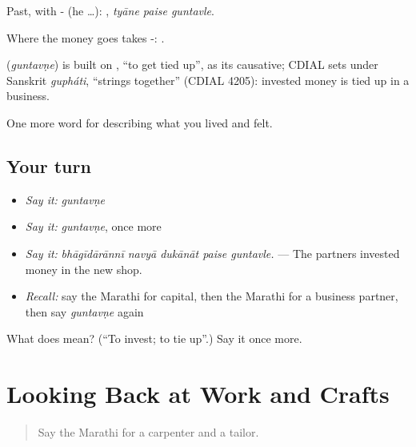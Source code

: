Past, with - (he …):   , \emph{tyāne paise guntavle}.

Where the money goes takes -:   .

\begin{cousinweb}
\textbf{} (\emph{guntavṇe}) is built on , \textquotedblleft{}to get tied up\textquotedblright{}, as its causative; CDIAL sets  under Sanskrit \emph{gupháti}, \textquotedblleft{}strings together\textquotedblright{} (CDIAL 4205): invested money is tied up in a business.
\end{cousinweb}

\begin{grammarlens}[title={What you've built}]
One more word for describing what you lived and felt.
\end{grammarlens}

\subsection*{Your turn}
\begin{itemize}
\raggedright
  \item \emph{Say it:} \emph{guntavṇe}
  \item \emph{Say it:} \emph{guntavṇe}, once more
  \item \emph{Say it:} \emph{bhāgīdārānnī navyā dukānāt paise guntavle.} — The partners invested money in the new shop.
  \item \emph{Recall:} say the Marathi for capital, then the Marathi for a business partner, then say \emph{guntavṇe} again
\end{itemize}

\begin{tcolorbox}[breakable,colback=teal!4,colframe=teal!35!black,title={Before you move on}]
What does  mean? (\textquotedblleft{}To invest; to tie up\textquotedblright{}.) Say it once more.
\end{tcolorbox}
\section[(dialogue)]{Looking Back at Work and Crafts}

\label{lesson:MR-R511-review-504-511}



\begin{quote}
Say the Marathi for a carpenter and a tailor.
\end{quote}

